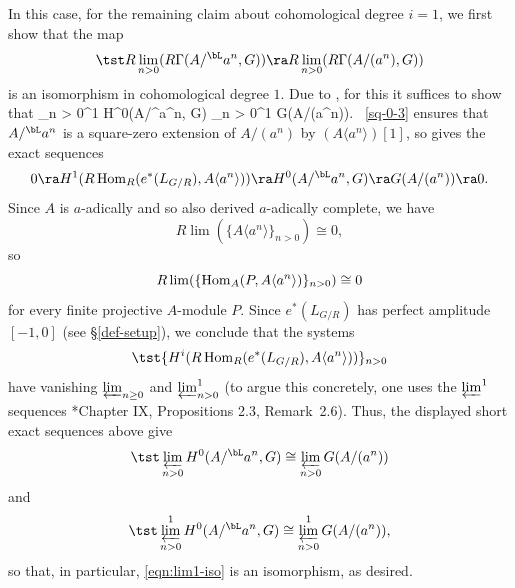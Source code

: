 In this case, for the remaining claim about cohomological degree $i = 1$, we first show that the map
\[
\tst R\lim_{n > 0}( R\Gamma(A/^\bL a^n, G)) \ra R\lim_{n > 0}( R\Gamma(A/(a^n), G))
\]
is an isomorphism in cohomological degree $1$. Due to , for this it suffices to show that
\be \label{eqn:lim1-iso}
\tst \varprojlim_{n > 0}^1 H^0(A/^\bL a^n, G) \isomto \varprojlim_{n > 0}^1 G(A/(a^n)).
\ee
{}~\ref{sq-0-3} ensures that $A/^\bL a^n$ is a square-zero extension of $A/(a^n)$ by $(A\langle a^n\rangle)[1]$, so  gives the exact sequences
\[
0 \ra H^1(R\Hom_R(e^*(L_{G/R}), A\langle a^n\rangle)) \ra H^0(A/^\bL a^n, G) \ra G(A/(a^n)) \ra 0.
\]
Since $A$ is $a$-adically and so also derived $a$-adically complete, we have
\[
R\lim(\{A\langle a^n\rangle\}_{n > 0}) \cong 0,
\]
so
\[
R\lim(\{\operatorname{Hom}_A(P, A\langle a^n\rangle)\}_{n > 0}) \cong 0
\]
for every finite projective $A$-module $P$. Since $e^*(L_{G/R})$ has perfect amplitude $[-1, 0]$ (see \S\ref{def-setup}), we conclude that the systems
\[
\tst \{H^i(R\Hom_R(e^*(L_{G/R}), A\langle a^n\rangle))\}_{n > 0}
\]
have vanishing $\varprojlim_{n\ge 0}$ and $\varprojlim_{n > 0}^1$ (to argue this concretely, one uses the $\varprojlim^1$ sequences \cite{BK72}*{Chapter IX, Propositions 2.3, Remark~2.6}). Thus, the displayed short exact sequences above give
\[
\tst \varprojlim_{n > 0} H^0(A/^\bL a^n, G) \cong \varprojlim_{n> 0} G(A/(a^n))
\]
and
\[
\tst \varprojlim_{n > 0}^1 H^0(A/^\bL a^n, G) \cong \varprojlim_{n> 0}^1 G(A/(a^n)),
\]
so that, in particular, \eqref{eqn:lim1-iso} is an isomorphism, as desired.

